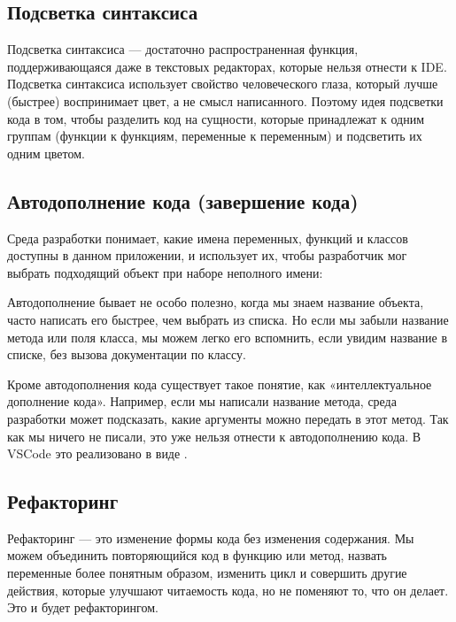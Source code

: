 \documentclass[letterpaper,10pt,russian]{sphinxmanual}
\begin{document}
\subsection{Подсветка синтаксиса}
\label{\detokenize{educational_materials/ide/content:id2}}
\sphinxAtStartPar
Подсветка синтаксиса — достаточно распространенная функция, поддерживающаяся даже в текстовых редакторах, которые нельзя отнести к IDE. Подсветка синтаксиса использует свойство человеческого глаза, который лучше (быстрее) воспринимает цвет, а не смысл написанного. Поэтому идея подсветки кода в том, чтобы разделить код на сущности, которые принадлежат к одним группам (функции к функциям, переменные к переменным) и подсветить их одним цветом.

\sphinxAtStartPar
{}


\subsection{Автодополнение кода (завершение кода)}
\label{\detokenize{educational_materials/ide/content:id3}}
\sphinxAtStartPar
Среда разработки понимает, какие имена переменных, функций и классов доступны в данном приложении, и использует их, чтобы разработчик мог выбрать подходящий объект при наборе неполного имени:

\sphinxAtStartPar
{}

\sphinxAtStartPar
Автодополнение бывает не особо полезно, когда мы знаем название объекта, часто написать его быстрее, чем выбрать из списка. Но если мы забыли название метода или поля класса, мы можем легко его вспомнить, если увидим название в списке, без вызова документации по классу.

\sphinxAtStartPar
{}

\sphinxAtStartPar
Кроме автодополнения кода существует такое понятие, как «интеллектуальное дополнение кода». Например, если мы написали название метода, среда разработки может подсказать, какие аргументы можно передать в этот метод. Так как мы ничего не писали, это уже нельзя отнести к автодополнению кода. В VSCode это реализовано в виде .

\sphinxAtStartPar
{}


\subsection{Рефакторинг}
\label{\detokenize{educational_materials/ide/content:id4}}
\sphinxAtStartPar
Рефакторинг — это изменение формы кода без изменения содержания. Мы можем объединить повторяющийся код в функцию или метод, назвать переменные более понятным образом, изменить цикл и совершить другие действия, которые улучшают читаемость кода, но не поменяют то, что он делает. Это и будет рефакторингом.
\end{document}

